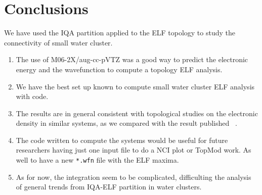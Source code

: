 \chapter{Conclusions}

We have used the IQA partition applied to the ELF topology to study the
connectivity of small water cluster.

\begin{enumerate}

\item The use of M06-2X/aug-cc-pVTZ was a good way to predict the electronic
energy and the wavefunction to compute a topology ELF analysis.

\item We have the best set up known to compute small water cluster ELF analysis
with {} code.

\item The results are in general consistent with topological studies on the
electronic density in similar systems, as we compared with the result published
~\cite{tomas, Toche2016, Castor2020}.

\item The code written to compute the systems would be useful for future
researchers having just one input file to do a NCI plot or TopMod work. As well
to have a new \texttt{*.wfn} file with the ELF maxima.

\item As for now, the integration seem to be complicated, difficulting the
analysis of general trends from IQA-ELF partition in water clusters.

\end{enumerate}


